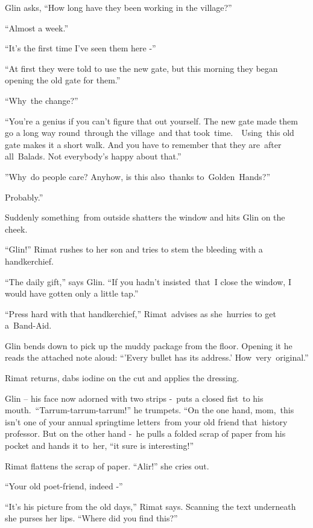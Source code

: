 \documentclass[twoside,11pt]{book}
\begin{document}
{Glin asks, ``How long have they been working in the village?'' }

{{}``Almost a week.'' }

{{}``It's the first time I've seen them here -{}'' }

{{}``}At first{ they
were told to use the new gate, but this morning they began opening the old gate for them.'' }

{{}``Why}{\ }{the
change?'' }

{}``You're a genius if you can't figure that out yourself. The new gate made them go a long way
{round\ through }the village\ and that took\ time.\ \ Using\ this old gate makes it a short walk. And
you have to remember that they are\ after all\ Balads. Not everybody{}'s happy about
that.''{\ }

{{}''Why\ do people care? Anyhow, is this
}also\ {thanks
to\ }Golden\ Hands{?''}

{{\textquotedbl}Probably.''}

{Suddenly something~from outside shatters the window and hits Glin on
the cheek.}

{{}``Glin!'' Rimat rushes to her son and tries to stem the bleeding
with a handkerchief.\ }

{{}``The daily gift,'' says Glin. ``If you hadn't
insisted\ }that\ {I close the window, I would have gotten only a
}little tap{.'' }

{{}``Press hard with }that
handkerchief,{{}'' Rimat\ advises as she\ hurries to get
a}{\ }Band-Aid.

{Glin bends down to pick up the muddy
}package{ from the floor. Opening it he reads the attached note aloud:
``'Every bullet has its address.'
How\ }very{\ }{original.''}

{Rimat returns, dabs iodine on the cut and }applies the
dressing{. }

{Glin }{}-- his face now adorned with two strips
-{\ }{puts }a closed
fist\ {to his mouth.\ }{}``Tarrum-tarrum-tarrum!{}'' he trumpets. ``On
the one hand, mom,{\ this isn{}'t one of your annual springtime
letters\ from your old friend that}{\ }{history
professor. But on the other hand -{\textquotedbl}\ he pulls a folded scrap of paper from his pocket and hands it
to\ }her,{ ``it sure is interesting!{}'' }

{Rimat flattens the scrap of paper. ``Alir!'' she cries out.}

{{}``Your old poet-friend, indeed -{}''}

{{}``It's his picture from the old days,{}'' Rimat says. Scanning the
text underneath she purses her lips. ``Where did you find this?{}''\ }
\end{document}
